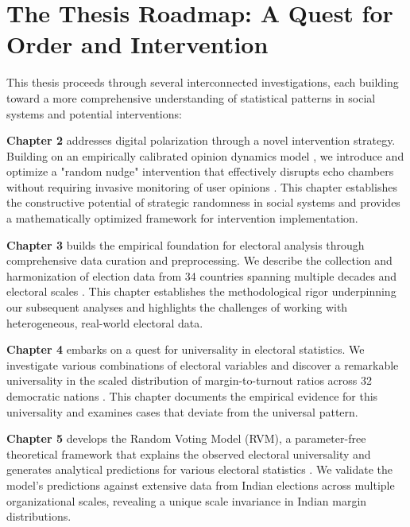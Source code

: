 \section{The Thesis Roadmap: A Quest for Order and Intervention}

This thesis proceeds through several interconnected investigations, each building toward a more comprehensive understanding of statistical patterns in social systems and potential interventions:

\textbf{Chapter 2} addresses digital polarization through a novel intervention strategy. Building on an empirically calibrated opinion dynamics model \cite{modeling-echo-chambers-and-polarizaiton-dynamics-in-social-networks}, we introduce and optimize a "random nudge" intervention that effectively disrupts echo chambers without requiring invasive monitoring of user opinions \cite{depolarization-of-echo-chambers-by-random-dynamical-nudge}. This chapter establishes the constructive potential of strategic randomness in social systems and provides a mathematically optimized framework for intervention implementation.

\textbf{Chapter 3} builds the empirical foundation for electoral analysis through comprehensive data curation and preprocessing. We describe the collection and harmonization of election data from 34 countries spanning multiple decades and electoral scales \cite{constituency-level-elections-archive, mit-election-data, election-data-canada, election-data-india}. This chapter establishes the methodological rigor underpinning our subsequent analyses and highlights the challenges of working with heterogeneous, real-world electoral data.

\textbf{Chapter 4} embarks on a quest for universality in electoral statistics. We investigate various combinations of electoral variables and discover a remarkable universality in the scaled distribution of margin-to-turnout ratios across 32 democratic nations \cite{universal-statistics-of-competition}. This chapter documents the empirical evidence for this universality and examines cases that deviate from the universal pattern.

\textbf{Chapter 5} develops the Random Voting Model (RVM), a parameter-free theoretical framework that explains the observed electoral universality and generates analytical predictions for various electoral statistics \cite{universal-statistics-of-competition, voter-turnouts-govern-key-electoral-statistics}. We validate the model's predictions against extensive data from Indian elections across multiple organizational scales, revealing a unique scale invariance in Indian margin distributions.

